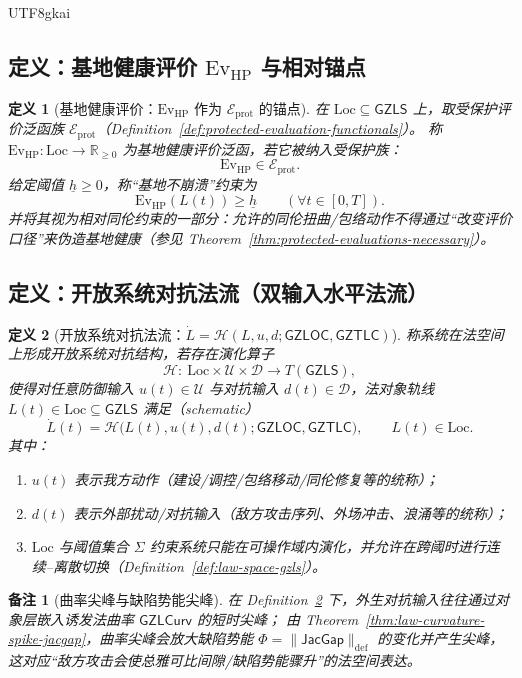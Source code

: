 \documentclass[12pt]{article}
\newtheorem{definition}{定义}[section]
\newtheorem{remark}{备注}[section]
\newcommand{\GZLS}{\ensuremath{\mathsf{GZLS}}}
\newcommand{\GZLOC}{\ensuremath{\mathsf{GZLOC}}}
\newcommand{\GZLCurv}{\ensuremath{\mathsf{GZLCurv}}}
\newcommand{\GZTLC}{\ensuremath{\mathsf{GZTLC}}}
\newcommand{\JacGap}{\ensuremath{\mathsf{JacGap}}}
\begin{document}
\begin{CJK*}{UTF8}{gkai}
\subsection{定义：基地健康评价 $\mathrm{Ev}_{\mathrm{HP}}$ 与相对锚点}

\begin{definition}[基地健康评价：$\mathrm{Ev}_{\mathrm{HP}}$ 作为 $\mathcal{E}_{\mathrm{prot}}$ 的锚点]
\label{def:base-health-evhp}
在 $\mathrm{Loc}\subseteq \GZLS$ 上，取受保护评价泛函族 $\mathcal{E}_{\mathrm{prot}}$（Definition~\ref{def:protected-evaluation-functionals}）。
称 $\mathrm{Ev}_{\mathrm{HP}}:\mathrm{Loc}\to\mathbb{R}_{\ge 0}$ 为基地健康评价泛函，若它被纳入受保护族：
\[
\mathrm{Ev}_{\mathrm{HP}}\in \mathcal{E}_{\mathrm{prot}}.
\]
给定阈值 $\underline{h}\ge 0$，称“基地不崩溃”约束为
\[
\mathrm{Ev}_{\mathrm{HP}}(L(t))\ge \underline{h}\qquad (\forall t\in[0,T]).
\]
并将其视为相对同伦约束的一部分：允许的同伦扭曲/包络动作不得通过“改变评价口径”来伪造基地健康（参见 Theorem~\ref{thm:protected-evaluations-necessary}）。
\end{definition}

\subsection{定义：开放系统对抗法流（双输入水平法流）}

\begin{definition}[开放系统对抗法流：$\dot L=\mathcal{H}(L,u,d;\GZLOC,\GZTLC)$]
\label{def:open-system-adversarial-law-flow}
称系统在法空间上形成开放系统对抗结构，若存在演化算子
\[
\mathcal{H}:\ \mathrm{Loc}\times \mathcal{U}\times \mathcal{D}\to T(\GZLS),
\]
使得对任意防御输入 $u(t)\in\mathcal{U}$ 与对抗输入 $d(t)\in\mathcal{D}$，法对象轨线 $L(t)\in\mathrm{Loc}\subseteq\GZLS$ 满足（schematic）
\[
\dot L(t)=\mathcal{H}\bigl(L(t),u(t),d(t);\GZLOC,\GZTLC\bigr),
\qquad
L(t)\in \mathrm{Loc}.
\]
其中：
\begin{enumerate}
  \item $u(t)$ 表示我方动作（建设/调控/包络移动/同伦修复等的统称）；
  \item $d(t)$ 表示外部扰动/对抗输入（敌方攻击序列、外场冲击、浪涌等的统称）；
  \item $\mathrm{Loc}$ 与阈值集合 $\Sigma$ 约束系统只能在可操作域内演化，并允许在跨阈时进行连续–离散切换（Definition~\ref{def:law-space-gzls}）。
\end{enumerate}
\end{definition}

\begin{remark}[曲率尖峰与缺陷势能尖峰]
在 Definition~\ref{def:open-system-adversarial-law-flow} 下，外生对抗输入往往通过对象层嵌入诱发法曲率 $\GZLCurv$ 的短时尖峰；
由 Theorem~\ref{thm:law-curvature-spike-jacgap}，曲率尖峰会放大缺陷势能 $\Phi=\|\JacGap\|_{\mathrm{def}}$ 的变化并产生尖峰，
这对应“敌方攻击会使总雅可比间隙/缺陷势能骤升”的法空间表达。
\end{remark}


\end{CJK*}
\end{document}
